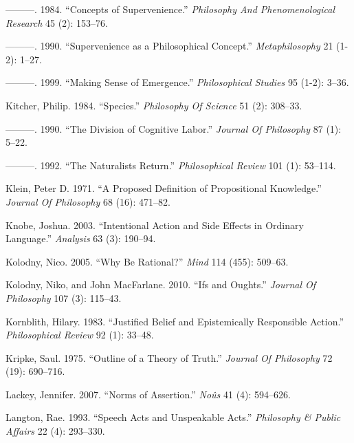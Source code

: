 \documentclass[
  10pt,
  letterpaper,
  DIV=11,
  numbers=noendperiod,
  twoside]{scrartcl}
\newlength{\cslhangindent}
\newenvironment{CSLReferences}[2] %
 {\begin{list}{}{%
  \setlength{\itemindent}{0pt}
  \setlength{\leftmargin}{0pt}
  \setlength{\parsep}{0pt}
  \ifodd #1
   \setlength{\leftmargin}{\cslhangindent}
   \setlength{\itemindent}{-1\cslhangindent}
  \fi
  \setlength{\itemsep}{#2\baselineskip}}}
 {\end{list}}
\begin{document}
\begin{CSLReferences}{1}{0}
---------. 1984. {``Concepts of Supervenience.''} \emph{Philosophy And
Phenomenological Research} 45 (2): 153--76.

---------. 1990. {``Supervenience as a Philosophical Concept.''}
\emph{Metaphilosophy} 21 (1-2): 1--27.

---------. 1999. {``Making Sense of Emergence.''} \emph{Philosophical
Studies} 95 (1-2): 3--36.

Kitcher, Philip. 1984. {``Species.''} \emph{Philosophy Of Science} 51
(2): 308--33.

---------. 1990. {``The Division of Cognitive Labor.''} \emph{Journal Of
Philosophy} 87 (1): 5--22.

---------. 1992. {``The Naturalists Return.''} \emph{Philosophical
Review} 101 (1): 53--114.

Klein, Peter D. 1971. {``A Proposed Definition of Propositional
Knowledge.''} \emph{Journal Of Philosophy} 68 (16): 471--82.

Knobe, Joshua. 2003. {``Intentional Action and Side Effects in Ordinary
Language.''} \emph{Analysis} 63 (3): 190--94.

Kolodny, Nico. 2005. {``Why Be Rational?''} \emph{Mind} 114 (455):
509--63.

Kolodny, Niko, and John MacFarlane. 2010. {``Ifs and Oughts.''}
\emph{Journal Of Philosophy} 107 (3): 115--43.

Kornblith, Hilary. 1983. {``Justified Belief and Epistemically
Responsible Action.''} \emph{Philosophical Review} 92 (1): 33--48.

Kripke, Saul. 1975. {``Outline of a Theory of Truth.''} \emph{Journal Of
Philosophy} 72 (19): 690--716.

Lackey, Jennifer. 2007. {``Norms of Assertion.''} \emph{Noûs} 41 (4):
594--626.

Langton, Rae. 1993. {``Speech Acts and Unspeakable Acts.''}
\emph{Philosophy \& Public Affairs} 22 (4): 293--330.


\end{CSLReferences}
\end{document}
